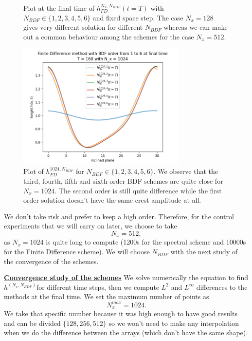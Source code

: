 \documentclass[12pt]{article}
\begin{document}
\begin{figure}[htbp]
\begin{minipage}[b]{0.45\textwidth}
        \caption{$N_x=512$}
        \label{fig:image2}
    \end{minipage}
    \caption{Plot at the final time of $h_{FD}^{N_x, N_{BDF}}(t=T)$ with $N_{BDF} \in \{1, 2, 3, 4, 5, 6\}$ and
    fixed space step. The case $N_x=128$ gives very different solution for different $N_{BDF}$ whereas we 
    can make out a common behaviour among the schemes for the case $N_x=512.$  }
    \label{fig:BDF_plot_128_512}
\end{figure}

\begin{figure}[h]
\centering
\includegraphics[width=0.75\textwidth]{Verif_scheme/plot_FD_BDF_Nx_1024.png}
\caption{Plot of $h_{FD}^{1024, N_{BDF}}$ for $N_{BDF} \in \{1, 2, 3, 4, 5, 6\}$.
We observe that the third, fourth, fifth and sixth order BDF schemes are quite close for $N_x = 1024.$ The second order is still quite difference while the first order solution doesn't have the same crest amplitude at all. }
\label{fig:BDF_plot_1024}
\end{figure}


We don't take risk and prefer to keep a high order. Therefore, for the control experiments that we will carry on later, we choose to take 
\begin{equation}
\boxed{
    N_x=512
    },
\end{equation}
as $N_x=1024$ is quite long to compute (1200s for the spectral scheme and 10000s for the Finite Difference scheme). 
We will choose $N_{BDF}$ with the next study of the convergence of the schemes.

\underline{\textbf{Convergence study of the schemes}}
We solve numerically the equation to find $h^{(N_x, N_{BDF})}$for different time steps, then we compute $L^2$ and $L^{\infty}$ differences to the methods at the final time. 
We set the maximum number of points as $$N_x^{max} = 1024.$$ We take that specific number because it was high enough to have good results and can be divided $\{128, 256, 512\}$ 
so we won't need to make any interpolation when we do the difference between the arrays (which don't have the same shape).
 
\end{document}
